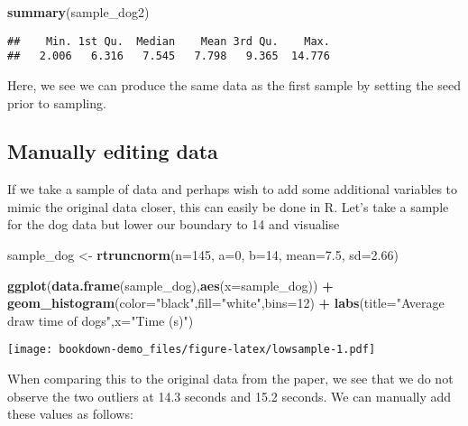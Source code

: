 \documentclass[
]{book}
\newenvironment{Shaded}{\begin{snugshade}}{\end{snugshade}}
\newcommand{\DataTypeTok}[1]{\textcolor[rgb]{0.13,0.29,0.53}{#1}}
\newcommand{\DecValTok}[1]{\textcolor[rgb]{0.00,0.00,0.81}{#1}}
\newcommand{\FloatTok}[1]{\textcolor[rgb]{0.00,0.00,0.81}{#1}}
\newcommand{\KeywordTok}[1]{\textcolor[rgb]{0.13,0.29,0.53}{\textbf{#1}}}
\newcommand{\NormalTok}[1]{#1}
\newcommand{\OperatorTok}[1]{\textcolor[rgb]{0.81,0.36,0.00}{\textbf{#1}}}
\newcommand{\StringTok}[1]{\textcolor[rgb]{0.31,0.60,0.02}{#1}}
\begin{document}
\begin{Shaded}
\begin{Highlighting}[]
\KeywordTok{summary}\NormalTok{(sample_dog2)}
\end{Highlighting}
\end{Shaded}

\begin{verbatim}
##    Min. 1st Qu.  Median    Mean 3rd Qu.    Max. 
##   2.006   6.316   7.545   7.798   9.365  14.776
\end{verbatim}

Here, we see we can produce the same data as the first sample by setting the seed prior to sampling.

\hypertarget{manually-editing-data}{%
\subsection{Manually editing data}\label{manually-editing-data}}

If we take a sample of data and perhaps wish to add some additional variables to mimic the original data closer, this can easily be done in R. Let's take a sample for the dog data but lower our boundary to 14 and visualise

\begin{Shaded}
\begin{Highlighting}[]
\NormalTok{sample_dog <-}\StringTok{ }\KeywordTok{rtruncnorm}\NormalTok{(}\DataTypeTok{n=}\DecValTok{145}\NormalTok{, }\DataTypeTok{a=}\DecValTok{0}\NormalTok{, }\DataTypeTok{b=}\DecValTok{14}\NormalTok{, }\DataTypeTok{mean=}\FloatTok{7.5}\NormalTok{, }\DataTypeTok{sd=}\FloatTok{2.66}\NormalTok{)}

\KeywordTok{ggplot}\NormalTok{(}\KeywordTok{data.frame}\NormalTok{(sample_dog),}\KeywordTok{aes}\NormalTok{(}\DataTypeTok{x=}\NormalTok{sample_dog)) }\OperatorTok{+}\StringTok{ }\KeywordTok{geom_histogram}\NormalTok{(}\DataTypeTok{color=}\StringTok{"black"}\NormalTok{,}\DataTypeTok{fill=}\StringTok{"white"}\NormalTok{,}\DataTypeTok{bins=}\DecValTok{12}\NormalTok{) }\OperatorTok{+}\StringTok{ }
\StringTok{            }\KeywordTok{labs}\NormalTok{(}\DataTypeTok{title=}\StringTok{"Average draw time of dogs"}\NormalTok{,}\DataTypeTok{x=}\StringTok{"Time (s)"}\NormalTok{)}
\end{Highlighting}
\end{Shaded}

\texttt{[image: bookdown-demo\_files/figure-latex/lowsample-1.pdf]}

When comparing this to the original data from the paper, we see that we do not observe the two outliers at 14.3 seconds and 15.2 seconds. We can manually add these values as follows:
\end{document}
